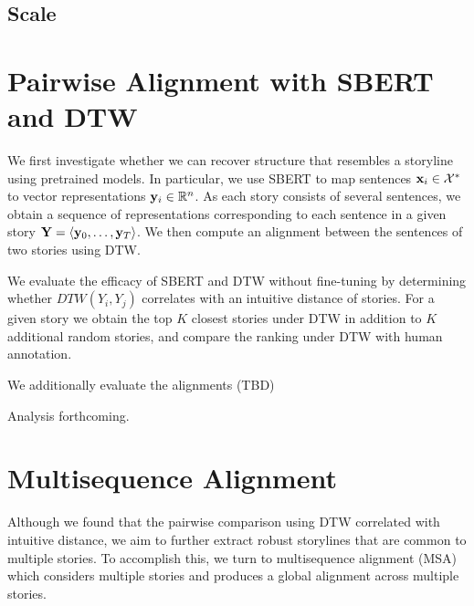 \documentclass{article}
\begin{document}
\begin{comment}
Additionally,
if a parameterized distance measure (with associated representations)
is correlated with human judgements for stories,
then it may be possible to engineer an unsupervised objective that allows
training of the parameterized distance to further improve performance.
This approach to analysis allows us to initially avoid expensive
likelihood-based methods that reconstruct full stories.
\end{comment}

\subsection{Scale}

\section{Pairwise Alignment with SBERT and DTW}
\label{pairwise}
We first investigate whether we can recover structure that resembles a storyline
using pretrained models.
In particular, we use SBERT \citep{reimers2019sbert}
to map sentences $\mathbf{x}_i \in \mathcal{X}^*$ to vector representations $\mathbf{y}_i \in \mathbb{R}^n$.
As each story consists of several sentences, we obtain a sequence of representations
corresponding to each sentence in a given story $\mathbf{Y} = \langle \mathbf{y}_0, \ldots, \mathbf{y}_T \rangle$.
We then compute an alignment between the sentences of two stories using DTW.

We evaluate the efficacy of SBERT and DTW without fine-tuning by determining whether
$DTW(Y_i, Y_j)$ correlates with an intuitive distance of stories.
For a given story we obtain the top $K$ closest stories under DTW
in addition to $K$ additional random stories,
and compare the ranking under DTW with human annotation.

We additionally evaluate the alignments (TBD)

Analysis forthcoming.

\section{Multisequence Alignment}
\label{msa}
Although we found that the pairwise comparison using DTW correlated with intuitive distance,
we aim to further extract robust storylines that are common to multiple stories.
To accomplish this, we turn to multisequence alignment (MSA) which
considers multiple stories and produces a global alignment across
multiple stories.
\end{document}
